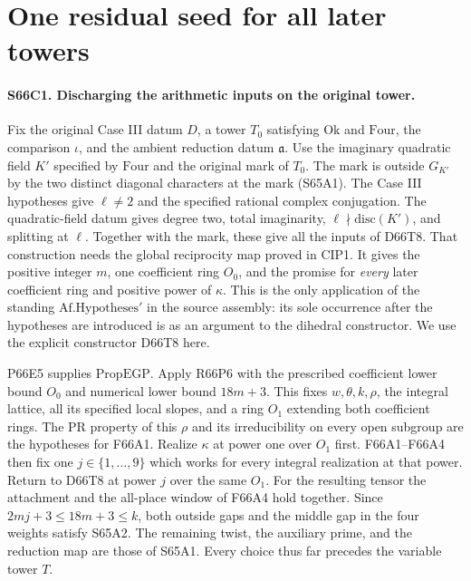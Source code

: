 \section{One residual seed for all later towers}

\paragraph{S66C1. Discharging the arithmetic inputs on the original tower.}
Fix the original Case III datum $D$, a tower $T_0$ satisfying
$\mathrm{Ok}$ and $\mathrm{Four}$, the comparison $\iota$, and
the ambient reduction datum $\mathfrak a$. Use the imaginary
quadratic field $K'$ specified by $\mathrm{Four}$ and the original
mark of $T_0$. The mark is outside $G_{K'}$ by the two distinct
diagonal characters at the mark (S65A1). The Case III hypotheses give $\ell\ne2$ and the specified rational
complex conjugation. The quadratic-field datum gives degree two, total
imaginarity, $\ell\nmid\mathrm{disc}(K')$, and splitting at $\ell$.
Together with the mark, these give all the inputs of D66T8. That
construction needs
the global reciprocity map proved in CIP1. It gives the positive
integer $m$, one coefficient ring $O_0$, and the promise for
\emph{every} later coefficient ring and positive power of $\kappa$.
This is the only application of the standing
$\mathrm{Af.Hypotheses}'$ in the source assembly: its sole occurrence
after the hypotheses are introduced is as an argument to the
dihedral constructor. We use the explicit constructor D66T8 here.

P66E5 supplies $\mathrm{PropEGP}$. Apply R66P6 with the prescribed
coefficient lower bound $O_0$ and numerical lower bound $18m+3$.
This fixes $w,\theta,k,\rho$, the integral lattice, all its specified
local slopes, and a ring $O_1$ extending both coefficient rings.
The $\mathrm{PR}$ property of this $\rho$ and its irreducibility
on every open subgroup are the hypotheses for F66A1. Realize
$\kappa$ at power one over $O_1$ first. F66A1--F66A4 then fix one
$j\in\{1,\ldots,9\}$ which works for every integral realization
at that power. Return to D66T8 at power $j$ over the same $O_1$.
For the resulting tensor the attachment and the all-place window
of F66A4 hold together. Since $2mj+3\le18m+3\le k$, both outside
gaps and the middle gap in the four weights satisfy S65A2.
The remaining twist, the auxiliary prime, and the reduction map are
those of S65A1. Every choice thus far precedes the variable tower $T$.

